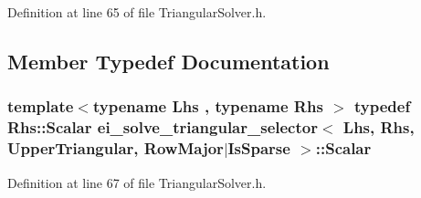 Definition at line 65 of file Triangular\-Solver.\-h.



\subsection{Member Typedef Documentation}
\hypertarget{structei__solve__triangular__selector_3_01_lhs_00_01_rhs_00_01_upper_triangular_00_01_row_major_7_is_sparse_01_4_a5d56908a46ec73cc1206e347ed0aff87}{
\subsubsection[{Scalar}]{\setlength{\rightskip}{0pt plus 5cm}template$<$typename Lhs , typename Rhs $>$ typedef Rhs\-::\-Scalar {\bf ei\-\_\-solve\-\_\-triangular\-\_\-selector}$<$ Lhs, Rhs, {\bf Upper\-Triangular}, {\bf Row\-Major}$|${\bf Is\-Sparse} $>$\-::{\bf Scalar}}}\label{structei__solve__triangular__selector_3_01_lhs_00_01_rhs_00_01_upper_triangular_00_01_row_major_7_is_sparse_01_4_a5d56908a46ec73cc1206e347ed0aff87}


Definition at line 67 of file Triangular\-Solver.\-h.



